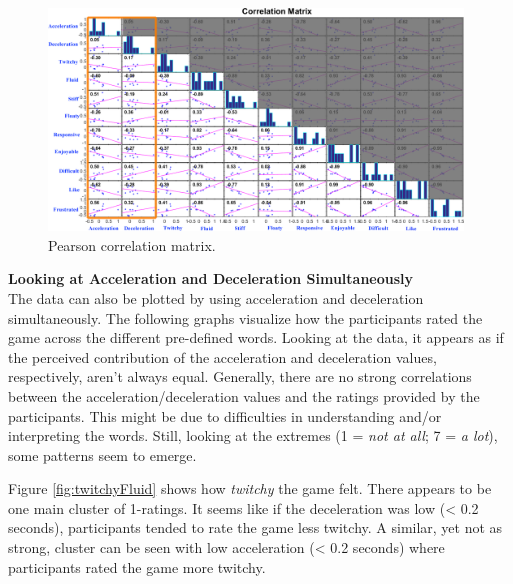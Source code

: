 

\begin{figure}[htbp]
\centering
\includegraphics[width=0.98\textwidth]{Pics/correlationMatrix_final}
\caption{Pearson correlation matrix.}
\label{fig:correlationMatrix}
\end{figure}

\textbf{Looking at Acceleration and Deceleration Simultaneously}\\
The data can also be plotted by using acceleration and deceleration simultaneously. The following graphs visualize how the participants rated the game across the different pre-defined words. Looking at the data, it appears as if the perceived contribution of the acceleration and deceleration values, respectively, aren't always equal. Generally, there are no strong correlations between the acceleration/deceleration values and the ratings provided by the participants. This might be due to difficulties in understanding and/or interpreting the words. Still, looking at the extremes (1 = \textit{not at all}; 7 = \textit{a lot}), some patterns seem to emerge.

Figure \ref{fig:twitchyFluid} shows  how \textit{twitchy} the game felt. There appears to be one main cluster of 1-ratings. It seems like if the deceleration was low (< 0.2 seconds), participants tended to rate the game less twitchy. A similar, yet not as strong, cluster can be seen with low acceleration (< 0.2 seconds) where participants rated the game more twitchy.

